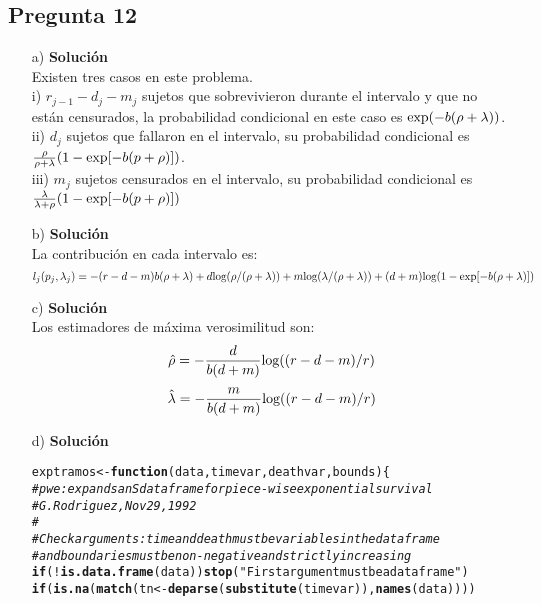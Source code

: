 \documentclass[10pt]{article}\usepackage[]{graphicx}\usepackage[]{color}
\makeatletter
\newcommand{\hlstr}[1]{\textcolor[rgb]{0.192,0.494,0.8}{#1}}%
\newcommand{\hlcom}[1]{\textcolor[rgb]{0.678,0.584,0.686}{\textit{#1}}}%
\newcommand{\hlopt}[1]{\textcolor[rgb]{0,0,0}{#1}}%
\newcommand{\hlstd}[1]{\textcolor[rgb]{0.345,0.345,0.345}{#1}}%
\newcommand{\hlkwa}[1]{\textcolor[rgb]{0.161,0.373,0.58}{\textbf{#1}}}%
\newcommand{\hlkwb}[1]{\textcolor[rgb]{0.69,0.353,0.396}{#1}}%
\newcommand{\hlkwc}[1]{\textcolor[rgb]{0.333,0.667,0.333}{#1}}%
\newcommand{\hlkwd}[1]{\textcolor[rgb]{0.737,0.353,0.396}{\textbf{#1}}}%
\newenvironment{kframe}{%
 \def\at@end@of@kframe{}%
 \ifinner\ifhmode%
  \def\at@end@of@kframe{\end{minipage}}%
  \begin{minipage}{\columnwidth}%
 \fi\fi%
 \def\FrameCommand##1{\hskip\@totalleftmargin \hskip-\fboxsep
 \colorbox{shadecolor}{##1}\hskip-\fboxsep
     \hskip-\linewidth \hskip-\@totalleftmargin \hskip\columnwidth}%
 \MakeFramed {\advance\hsize-\width
   \@totalleftmargin\z@ \linewidth\hsize
   \@setminipage}}%
 {\par\unskip\endMakeFramed%
 \at@end@of@kframe}
\newenvironment{knitrout}{}{} %
\makeatother
\begin{document}
{\subsection*{Pregunta 12} 
\begin{itemize}
\item[a)]\textbf{Solución}\\
Existen tres casos en este problema.\\
i) $r_{j-1}-d_{j}-m_{j}$ sujetos que sobrevivieron durante el intervalo y que no están censurados, la probabilidad condicional en este caso es $\textnormal{exp}(-b(\rho+\lambda))$.\\
ii) $d_{j}$ sujetos que fallaron en el intervalo, su probabilidad condicional es $\frac{\rho}{\rho+\lambda}(1-\textnormal{exp}[-b(p+\rho)])$.\\
iii) $m_{j}$ sujetos censurados en el intervalo, su probabilidad condicional es $\frac{\lambda}{\lambda+\rho}(1-\textnormal{exp}[-b(p+\rho)])$
\item[b)]\textbf{Solución}\\
La contribución en cada intervalo es:
$$l_{j}(p_{j},\lambda_{j})=-(r-d-m)b(\rho+\lambda)+d\textnormal{log}(\rho/(\rho+\lambda))+m\textnormal{log}(\lambda/(\rho+\lambda))+(d+m)\textnormal{log}(1-\textnormal{exp}[-b(\rho+\lambda)])$$
\item[c)]\textbf{Solución}\\
Los estimadores de máxima verosimilitud son:
$$\hat{\rho}=-\frac{d}{b(d+m)}\textnormal{log}((r-d-m)/r)$$
$$\hat{\lambda}=-\frac{m}{b(d+m)}\textnormal{log}((r-d-m)/r)$$
\item[d)]\textbf{Solución}\\
\begin{knitrout}
\color{fgcolor}\begin{kframe}
\begin{alltt}
\hlstd{exptramos} \hlkwb{<-} \hlkwa{function}\hlstd{(}\hlkwc{data}\hlstd{,} \hlkwc{timevar}\hlstd{,} \hlkwc{deathvar}\hlstd{,} \hlkwc{bounds}\hlstd{) \{}
  \hlcom{# pwe: expands an S data frame for piece-wise exponential survival}
  \hlcom{# G. Rodriguez, Nov 29, 1992}
  \hlcom{#}
  \hlcom{# Check arguments: time and death must be variables in the data frame}
  \hlcom{# and boundaries must be non-negative and strictly increasing}
  \hlkwa{if}\hlstd{(}\hlopt{!}\hlkwd{is.data.frame}\hlstd{(data))} \hlkwd{stop}\hlstd{(}\hlstr{"First argument must be a data frame"}\hlstd{)}
  \hlkwa{if}\hlstd{(}\hlkwd{is.na}\hlstd{(}\hlkwd{match}\hlstd{(tn} \hlkwb{<-} \hlkwd{deparse}\hlstd{(}\hlkwd{substitute}\hlstd{(timevar)),} \hlkwd{names}\hlstd{(data))))}

\end{alltt}
\end{kframe}
\end{knitrout}
\end{itemize}}
\end{document}
